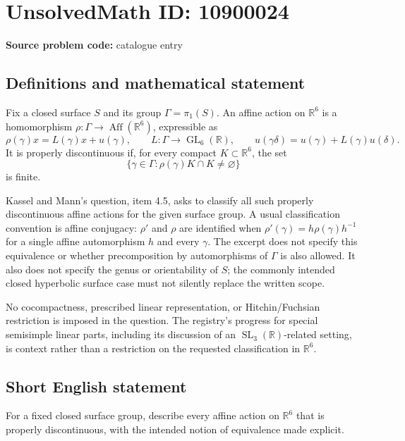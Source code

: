 \documentclass[11pt]{article}
\newcommand{\R}{\mathbb{R}}
\begin{document}
\section*{UnsolvedMath ID: 10900024}
\textbf{Source problem code:} catalogue entry
\subsection{Definitions and mathematical statement}
Fix a closed surface $S$ and its group $\Gamma=\pi_1(S)$. An affine action on $\R^6$ is a homomorphism $\rho:\Gamma\to\operatorname{Aff}(\R^6)$, expressible as
\[
 \rho(\gamma)x=L(\gamma)x+u(\gamma),\qquad
 L:\Gamma\to\operatorname{GL}_6(\R),\qquad
 u(\gamma\delta)=u(\gamma)+L(\gamma)u(\delta).
\]
It is properly discontinuous if, for every compact $K\subset\R^6$, the set
\[
 \{\gamma\in\Gamma:\rho(\gamma)K\cap K\ne\varnothing\}
\]
is finite.

Kassel and Mann's question, item 4.5, asks to classify all such properly discontinuous affine actions for the given surface group. A usual classification convention is affine conjugacy: $\rho'$ and $\rho$ are identified when $\rho'(\gamma)=h\rho(\gamma)h^{-1}$ for a single affine automorphism $h$ and every $\gamma$. The excerpt does not specify this equivalence or whether precomposition by automorphisms of $\Gamma$ is also allowed. It also does not specify the genus or orientability of $S$; the commonly intended closed hyperbolic surface case must not silently replace the written scope.

No cocompactness, prescribed linear representation, or Hitchin/Fuchsian restriction is imposed in the question. The registry's progress for special semisimple linear parts, including its discussion of an $\operatorname{SL}_3(\R)$-related setting, is context rather than a restriction on the requested classification in $\R^6$.
\subsection{Short English statement}
For a fixed closed surface group, describe every affine action on $\R^6$ that is properly discontinuous, with the intended notion of equivalence made explicit.
\end{document}
